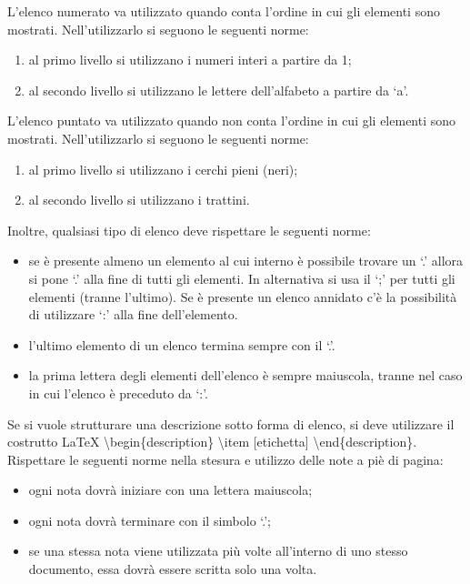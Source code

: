 						L’elenco numerato va utilizzato quando conta l’ordine in cui gli elementi sono mostrati. Nell’utilizzarlo si seguono le seguenti norme:
						\begin{enumerate}
							\item al primo livello si utilizzano i numeri interi a partire da 1;
							\item al secondo livello si utilizzano le lettere dell’alfabeto a partire da ‘a’.
						\end{enumerate}
						L’elenco puntato va utilizzato quando non conta l’ordine in cui gli elementi sono mostrati. Nell’utilizzarlo si seguono le seguenti norme:
						\begin{enumerate}
							\item al primo livello si utilizzano i cerchi pieni (neri);
							\item al secondo livello si utilizzano i trattini.
						\end{enumerate}
						Inoltre, qualsiasi tipo di elenco deve rispettare le seguenti norme:
						\begin{itemize}
							\item se è presente almeno un elemento al cui interno è possibile trovare un ‘.’ allora si pone ‘.’ alla fine di tutti gli elementi. In alternativa si usa il ‘;’ per tutti gli elementi (tranne l’ultimo). Se è presente un elenco annidato c’è la possibilità di utilizzare ‘:’ alla fine dell’elemento.
							\item l’ultimo elemento di un elenco termina sempre con il ‘.’.
							\item la prima lettera degli elementi dell’elenco è sempre maiuscola, tranne nel caso in cui l’elenco è preceduto da ‘:’.
						\end{itemize}
						Se si vuole strutturare una descrizione sotto forma di elenco, si deve utilizzare il costrutto \LaTeX{} \textbackslash begin\{description\} \textbackslash item [etichetta] \textbackslash end\{description\}.
						Rispettare le seguenti norme nella stesura e utilizzo delle note a piè di pagina:
						\begin{itemize}
							\item ogni nota dovrà iniziare con una lettera maiuscola;
							\item ogni nota dovrà terminare con il simbolo ‘.’;
							\item se una stessa nota viene utilizzata più volte all’interno di uno stesso documento, essa dovrà essere scritta solo una volta.
						\end{itemize}
